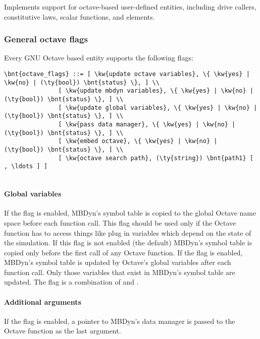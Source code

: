\noindent
Implements support for octave-based user-defined entities, including
drive callers, constitutive laws, scalar functions, and elements.

\subsubsection{General octave flags}
Every GNU Octave based entity supports the following flags:
\begin{Verbatim}[commandchars=\\\{\}]
	\bnt{octave_flags} ::= [ \kw{update octave variables}, \{ \kw{yes} | \kw{no} | (\ty{bool}) \bnt{status} \}, ] \\
			   [ \kw{update mbdyn variables}, \{ \kw{yes} | \kw{no} | (\ty{bool}) \bnt{status} \}, ] \\
			   [ \kw{update global variables}, \{ \kw{yes} | \kw{no} | (\ty{bool}) \bnt{status} \}, ] \\
			   [ \kw{pass data manager}, \{ \kw{yes} | \kw{no} | (\ty{bool}) \bnt{status} \}, ] \\
			   [ \kw{embed octave}, \{ \kw{yes} | \kw{no} | (\ty{bool}) \bnt{status} \}, ] \\
			   [ \kw{octave search path}, (\ty{string}) \bnt{path1} [ , \ldots ] ]
						   
\end{Verbatim}
\paragraph{Global variables}
If the flag  is enabled, MBDyn's symbol table is copied to the global Octave name space before each function call.
This flag should be used only if the Octave function has to access things like plug in variables which depend on the state of the simulation.
If this flag is not enabled (the default) MBDyn's symbol table is copied only before the first call of any Octave function.
If the flag  is enabled, MBDyn's symbol table is updated by Octave's global variables after each function call.
Only those variables that exist in MBDyn's symbol table are updated.
The flag  is a combination of  and .

\paragraph{Additional arguments}
If the flag  is enabled, a pointer to MBDyn's data manager is passed to the Octave function as the last argument.

